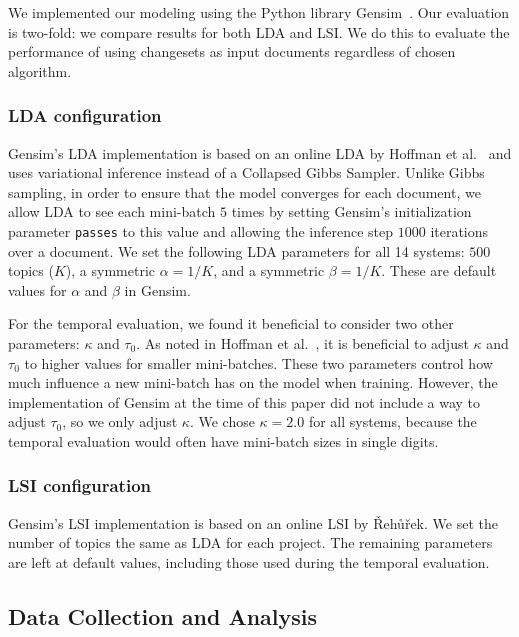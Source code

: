 We implemented our modeling using the Python library Gensim~\cite{Gensim}.
Our evaluation is two-fold: we compare results for both LDA and LSI.
We do this to evaluate the performance of using changesets as input
documents regardless of chosen algorithm.

\subsubsection{LDA configuration}

Gensim's LDA implementation is based on an online LDA by Hoffman et al.~\cite{Hoffman-etal:2010}
and uses variational inference instead of a Collapsed Gibbs Sampler.
Unlike Gibbs sampling, in order to ensure that the model converges for each document,
we allow LDA to see each mini-batch $5$ times by setting Gensim's initialization parameter \texttt{passes} to this value
and allowing the inference step $1000$ iterations over a document.
We set the following LDA parameters for all 14 systems:
$500$ topics ($K$), a symmetric $\alpha=1/K$, and a symmetric $\beta=1/K$.
These are default values for $\alpha$ and $\beta$ in Gensim.

For the temporal evaluation, we found it beneficial to consider two other parameters: $\kappa$ and $\tau_0$.
As noted in Hoffman et al.~\cite{Hoffman-etal:2010}, it is beneficial to
adjust $\kappa$ and $\tau_0$ to higher values for smaller mini-batches.
These two parameters control how much influence a new mini-batch has on the model when training.
However, the implementation of Gensim at the time of this paper did not
include a way to adjust $\tau_0$, so we only adjust $\kappa$.
We chose $\kappa=2.0$ for all systems, because the temporal evaluation
would often have mini-batch sizes in single digits.

\subsubsection{LSI configuration}

Gensim's LSI implementation is based on an online LSI by {\v R}eh{\r u}{\v r}ek\cite{Radim:2011}.
We set the number of topics the same as LDA for each project.
The remaining parameters are left at default values, including those used
during the temporal evaluation.




\subsection{Data Collection and Analysis}
\label{sec:data}

